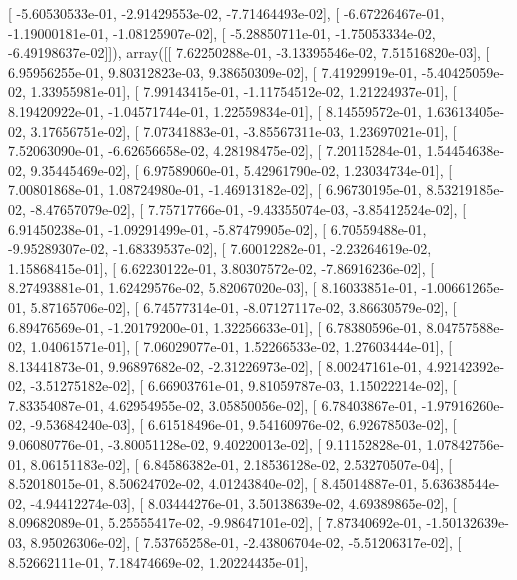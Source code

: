 \documentclass{article}
\begin{document}
       [ -5.60530533e-01,  -2.91429553e-02,  -7.71464493e-02],
       [ -6.67226467e-01,  -1.19000181e-01,  -1.08125907e-02],
       [ -5.28850711e-01,  -1.75053334e-02,  -6.49198637e-02]]), array([[  7.62250288e-01,  -3.13395546e-02,   7.51516820e-03],
       [  6.95956255e-01,   9.80312823e-03,   9.38650309e-02],
       [  7.41929919e-01,  -5.40425059e-02,   1.33955981e-01],
       [  7.99143415e-01,  -1.11754512e-02,   1.21224937e-01],
       [  8.19420922e-01,  -1.04571744e-01,   1.22559834e-01],
       [  8.14559572e-01,   1.63613405e-02,   3.17656751e-02],
       [  7.07341883e-01,  -3.85567311e-03,   1.23697021e-01],
       [  7.52063090e-01,  -6.62656658e-02,   4.28198475e-02],
       [  7.20115284e-01,   1.54454638e-02,   9.35445469e-02],
       [  6.97589060e-01,   5.42961790e-02,   1.23034734e-01],
       [  7.00801868e-01,   1.08724980e-01,  -1.46913182e-02],
       [  6.96730195e-01,   8.53219185e-02,  -8.47657079e-02],
       [  7.75717766e-01,  -9.43355074e-03,  -3.85412524e-02],
       [  6.91450238e-01,  -1.09291499e-01,  -5.87479905e-02],
       [  6.70559488e-01,  -9.95289307e-02,  -1.68339537e-02],
       [  7.60012282e-01,  -2.23264619e-02,   1.15868415e-01],
       [  6.62230122e-01,   3.80307572e-02,  -7.86916236e-02],
       [  8.27493881e-01,   1.62429576e-02,   5.82067020e-03],
       [  8.16033851e-01,  -1.00661265e-01,   5.87165706e-02],
       [  6.74577314e-01,  -8.07127117e-02,   3.86630579e-02],
       [  6.89476569e-01,  -1.20179200e-01,   1.32256633e-01],
       [  6.78380596e-01,   8.04757588e-02,   1.04061571e-01],
       [  7.06029077e-01,   1.52266533e-02,   1.27603444e-01],
       [  8.13441873e-01,   9.96897682e-02,  -2.31226973e-02],
       [  8.00247161e-01,   4.92142392e-02,  -3.51275182e-02],
       [  6.66903761e-01,   9.81059787e-03,   1.15022214e-02],
       [  7.83354087e-01,   4.62954955e-02,   3.05850056e-02],
       [  6.78403867e-01,  -1.97916260e-02,  -9.53684240e-03],
       [  6.61518496e-01,   9.54160976e-02,   6.92678503e-02],
       [  9.06080776e-01,  -3.80051128e-02,   9.40220013e-02],
       [  9.11152828e-01,   1.07842756e-01,   8.06151183e-02],
       [  6.84586382e-01,   2.18536128e-02,   2.53270507e-04],
       [  8.52018015e-01,   8.50624702e-02,   4.01243840e-02],
       [  8.45014887e-01,   5.63638544e-02,  -4.94412274e-03],
       [  8.03444276e-01,   3.50138639e-02,   4.69389865e-02],
       [  8.09682089e-01,   5.25555417e-02,  -9.98647101e-02],
       [  7.87340692e-01,  -1.50132639e-03,   8.95026306e-02],
       [  7.53765258e-01,  -2.43806704e-02,  -5.51206317e-02],
       [  8.52662111e-01,   7.18474669e-02,   1.20224435e-01],
\end{document}
